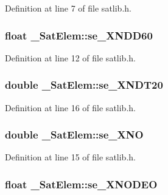 Definition at line 7 of file satlib.\-h.

\hypertarget{struct___sat_elem_aae09d71117e666583cbcf89186b10865}{
\subsubsection[{se\-\_\-\-X\-N\-D\-D60}]{\setlength{\rightskip}{0pt plus 5cm}float \-\_\-\-Sat\-Elem\-::se\-\_\-\-X\-N\-D\-D60}}\label{struct___sat_elem_aae09d71117e666583cbcf89186b10865}


Definition at line 12 of file satlib.\-h.

\hypertarget{struct___sat_elem_a7dbd7b9b28a50bfbe0313592200f02b3}{
\subsubsection[{se\-\_\-\-X\-N\-D\-T20}]{\setlength{\rightskip}{0pt plus 5cm}double \-\_\-\-Sat\-Elem\-::se\-\_\-\-X\-N\-D\-T20}}\label{struct___sat_elem_a7dbd7b9b28a50bfbe0313592200f02b3}


Definition at line 16 of file satlib.\-h.

\hypertarget{struct___sat_elem_aafa866947f4ac775274333db067aac77}{
\subsubsection[{se\-\_\-\-X\-N\-O}]{\setlength{\rightskip}{0pt plus 5cm}double \-\_\-\-Sat\-Elem\-::se\-\_\-\-X\-N\-O}}\label{struct___sat_elem_aafa866947f4ac775274333db067aac77}


Definition at line 15 of file satlib.\-h.

\hypertarget{struct___sat_elem_a74d35f2c9772d5951cb24aa631e3e4df}{
\subsubsection[{se\-\_\-\-X\-N\-O\-D\-E\-O}]{\setlength{\rightskip}{0pt plus 5cm}float \-\_\-\-Sat\-Elem\-::se\-\_\-\-X\-N\-O\-D\-E\-O}}\label{struct___sat_elem_a74d35f2c9772d5951cb24aa631e3e4df}


